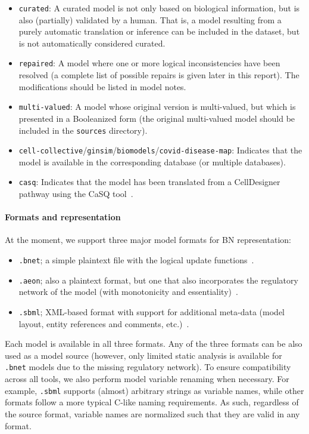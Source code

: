 \documentclass{article}
\begin{document}
\begin{itemize}
	\item \texttt{curated}: A curated model is not only based on biological information, but is also (partially) validated by a human. That is, a model resulting from a purely automatic translation or inference can be included in the dataset, but is not automatically considered curated.
	\item \texttt{repaired}: A model where one or more logical inconsistencies have been resolved (a complete list of possible repairs is given later in this report). The modifications should be listed in model notes.
	\item \texttt{multi-valued}: A model whose original version is multi-valued, but which is presented in a Booleanized form (the original multi-valued model should be included in the \texttt{sources} directory).
	\item \texttt{cell-collective}/\texttt{ginsim}/\texttt{biomodels}/\texttt{covid-disease-map}: Indicates that the model is available in the corresponding database (or multiple databases).
	\item \texttt{casq}: Indicates that the model has been translated from a CellDesigner pathway using the CaSQ tool~\cite{casq}.
\end{itemize}

\paragraph{Formats and representation} At the moment, we support three major model formats for BN representation: 

\begin{itemize}
	\item \texttt{.bnet}; a simple plaintext file with the logical update functions~\cite{pyboolnet}.
	\item \texttt{.aeon}; also a plaintext format, but one that also incorporates the regulatory network of the model (with monotonicity and essentiality)~\cite{aeon}.
	\item \texttt{.sbml}; XML-based format with support for additional meta-data (model layout, entity references and comments, etc.)~\cite{sbml-qual}.
\end{itemize}

Each model is available in all three formats. Any of the three formats can be also used as a model source (however, only limited static analysis is available for \texttt{.bnet} models due to the missing regulatory network). To ensure compatibility across all tools, we also perform model variable renaming when necessary. For example, \texttt{.sbml} supports (almost) arbitrary strings as variable names, while other formats follow a more typical C-like naming requirements. As such, regardless of the source format, variable names are normalized such that they are valid in any format.
\end{document}
